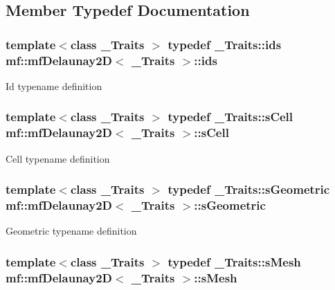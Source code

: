 \subsection{Member Typedef Documentation}
\hypertarget{classmf_1_1mfDelaunay2D_af821015a498654435308272878e686f2}{
\subsubsection[{ids}]{\setlength{\rightskip}{0pt plus 5cm}template$<$class \_\-Traits $>$ typedef \_\-Traits::ids {\bf mf::mfDelaunay2D}$<$ \_\-Traits $>$::{\bf ids}}}
\label{classmf_1_1mfDelaunay2D_af821015a498654435308272878e686f2}
Id typename definition \hypertarget{classmf_1_1mfDelaunay2D_ad78e8b9a85b29e1a284d1e613107cb81}{
\subsubsection[{sCell}]{\setlength{\rightskip}{0pt plus 5cm}template$<$class \_\-Traits $>$ typedef \_\-Traits::sCell {\bf mf::mfDelaunay2D}$<$ \_\-Traits $>$::{\bf sCell}}}
\label{classmf_1_1mfDelaunay2D_ad78e8b9a85b29e1a284d1e613107cb81}
Cell typename definition \hypertarget{classmf_1_1mfDelaunay2D_a4e309eb0d3c22a7e6ec87e6e85d2e837}{
\subsubsection[{sGeometric}]{\setlength{\rightskip}{0pt plus 5cm}template$<$class \_\-Traits $>$ typedef \_\-Traits::sGeometric {\bf mf::mfDelaunay2D}$<$ \_\-Traits $>$::{\bf sGeometric}}}
\label{classmf_1_1mfDelaunay2D_a4e309eb0d3c22a7e6ec87e6e85d2e837}
Geometric typename definition \hypertarget{classmf_1_1mfDelaunay2D_ad1c5c239afa497e1c8edef8f1046a58a}{
\subsubsection[{sMesh}]{\setlength{\rightskip}{0pt plus 5cm}template$<$class \_\-Traits $>$ typedef \_\-Traits::sMesh {\bf mf::mfDelaunay2D}$<$ \_\-Traits $>$::{\bf sMesh}}}
\label{classmf_1_1mfDelaunay2D_ad1c5c239afa497e1c8edef8f1046a58a}
